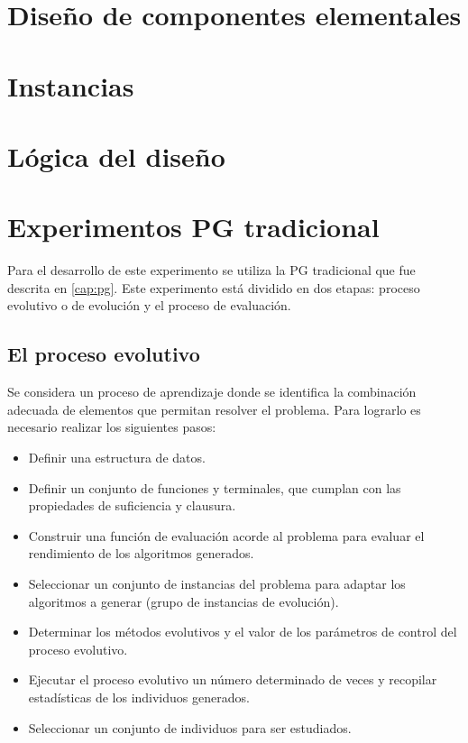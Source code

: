 \section{Diseño de componentes elementales}
\section{Instancias}
\section{Lógica del diseño}\label{cap:logica_diseno}

\section{Experimentos PG tradicional}\label{cap:experimento_tradicional}
Para el desarrollo de este experimento se utiliza la PG tradicional que fue descrita en \ref{cap:pg}. Este experimento está dividido en dos etapas: proceso evolutivo o de evolución y el proceso de evaluación.

\subsection{El proceso evolutivo}
Se considera un proceso de aprendizaje donde se identifica la combinación adecuada de elementos que permitan resolver el problema. Para lograrlo es necesario realizar los siguientes pasos:

\begin{itemize}
  \item Definir una estructura de datos.
  \item Definir un conjunto de funciones y terminales, que cumplan con las propiedades de suficiencia y clausura.
  \item Construir una función de evaluación acorde al problema para evaluar el rendimiento de los algoritmos generados.
  \item Seleccionar un conjunto de instancias del problema para adaptar los algoritmos a generar (grupo de instancias de evolución).
  \item Determinar los métodos evolutivos y el valor de los parámetros de control del proceso evolutivo.
  \item Ejecutar el proceso evolutivo un número determinado de veces y recopilar estadísticas de los individuos generados.
  \item Seleccionar un conjunto de individuos para ser estudiados.
\end{itemize}

